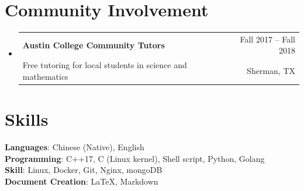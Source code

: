 \documentclass[A4,11pt]{article}
\makeatletter
\newcommand{\CVSubheading}[4]{
  \vspace{-2pt}\item
    \begin{tabular*}{0.97\textwidth}[t]{l@{\extracolsep{\fill}}r}
      \textbf{#1} & #2 \\
      \small#3 & \small #4 \\
    \end{tabular*}\vspace{-7pt}
}
\newcommand{\CVSubHeadingListStart}{\begin{itemize}[leftmargin=0.5cm, label={}]}
\newcommand{\CVSubHeadingListEnd}{\end{itemize}}
\makeatother
\begin{document}
\section{Community Involvement}
\CVSubHeadingListStart
\CVSubheading
{Austin College Community Tutors}{Fall 2017 -- Fall 2018}
{Free tutoring for local students in science and mathematics}{Sherman, TX}
\CVSubHeadingListEnd

\section{Skills}
\begin{itemize}[leftmargin=0.5cm, label={}]
    \small{\item{
          \textbf{Languages}{: Chinese (Native), English} \\
          \textbf{Programming}{: C++17, C (Linux kernel), Shell script, Python, Golang } \\
          \textbf{Skill}{: Linux, Docker, Git, Nginx, mongoDB } \\
          \textbf{Document Creation}{: \LaTeX, Markdown} \\
          }}
\end{itemize}

\end{document}
